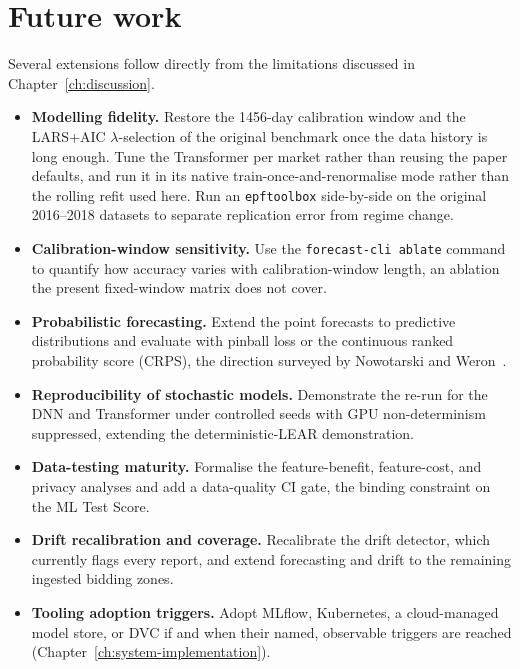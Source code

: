 \section{Future work}

Several extensions follow directly from the limitations discussed in
Chapter~\ref{ch:discussion}.

\begin{itemize}
  \item \textbf{Modelling fidelity.} Restore the 1456-day calibration window and
    the LARS+AIC $\lambda$-selection of the original benchmark once the data
    history is long enough. Tune the Transformer per market rather than reusing
    the paper defaults, and run it in its native train-once-and-renormalise mode
    rather than the rolling refit used here. Run an \texttt{epftoolbox} side-by-side
    on the original 2016--2018 datasets to separate replication error from regime
    change.
  \item \textbf{Calibration-window sensitivity.} Use the \texttt{forecast-cli
    ablate} command to quantify how accuracy varies with calibration-window
    length, an ablation the present fixed-window matrix does not cover.
  \item \textbf{Probabilistic forecasting.} Extend the point forecasts to
    predictive distributions and evaluate with pinball loss or the continuous
    ranked probability score (CRPS), the
    direction surveyed by Nowotarski and Weron~\cite{nowotarski2018}.
  \item \textbf{Reproducibility of stochastic models.} Demonstrate the re-run
    for the DNN and Transformer under controlled seeds with GPU non-determinism
    suppressed, extending the deterministic-LEAR demonstration.
  \item \textbf{Data-testing maturity.} Formalise the feature-benefit,
    feature-cost, and privacy analyses and add a data-quality CI gate, the
    binding constraint on the ML Test Score.
  \item \textbf{Drift recalibration and coverage.} Recalibrate the drift detector,
    which currently flags every report, and extend forecasting and drift to the
    remaining ingested bidding zones.
  \item \textbf{Tooling adoption triggers.} Adopt MLflow, Kubernetes, a
    cloud-managed model store, or DVC if and when their named, observable
    triggers are reached (Chapter~\ref{ch:system-implementation}).
\end{itemize}

